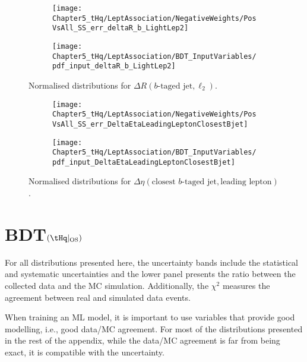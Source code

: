 \begin{figure}[h]
\centering
\begin{subfigure}{.46\textwidth}
  \centering
  \texttt{[image: Chapter5\_tHq/LeptAssociation/NegativeWeights/PosVsAll\_SS\_err\_deltaR\_b\_LightLep2]}
\end{subfigure}%
\begin{subfigure}{.46\textwidth}
  \centering
  \texttt{[image: Chapter5\_tHq/LeptAssociation/BDT\_InputVariables/pdf\_input\_deltaR\_b\_LightLep2]}
\end{subfigure}
\caption{Normalised distributions for $\Delta R(b\text{-taged jet}, \ell_{2})$.}
\label{fig:Appendix:BDTVARS:LeptonAssignment:deltaR_b_LightLep2}
\end{figure}

\begin{figure}[h]
\centering
\begin{subfigure}{.46\textwidth}
  \centering
  \texttt{[image: Chapter5\_tHq/LeptAssociation/NegativeWeights/PosVsAll\_SS\_err\_DeltaEtaLeadingLeptonClosestBjet]}
\end{subfigure}%
\begin{subfigure}{.46\textwidth}
  \centering
  \texttt{[image: Chapter5\_tHq/LeptAssociation/BDT\_InputVariables/pdf\_input\_DeltaEtaLeadingLeptonClosestBjet]}
\end{subfigure}
\caption{Normalised distributions for $\Delta \eta(\text{closest }b\text{-taged jet}, \text{leading lepton})$.}
\label{fig:Appendix:BDTVARS:LeptonAssignment:DeltaEtaLeadingLeptonClosestBjet}
\end{figure}



\FloatBarrier


\section{BDT$(\tHq|_{\text{OS}})$}
\label{chap:Appendix:BDT_Variables:OS_tHq}
For all distributions presented here, the uncertainty bands include the statistical and 
systematic uncertainties and the lower panel presents the ratio between the collected 
data and the MC simulation. Additionally, the $\chi^2$ measures the agreement between 
real and simulated data events.

When training an ML model, it is important to use variables that provide good modelling, i.e., good data/MC agreement.
For most of the distributions presented in the rest of the appendix, while the data/MC agreement is far from being exact,  
it is compatible with the uncertainty.

